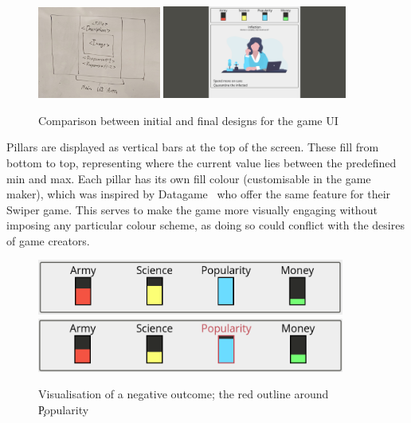 \begin{figure}[!h]
	\centering
	\includegraphics[width=0.36\textwidth]{./images/design/game_drawing.jpg}
	\includegraphics[width=0.54\textwidth]{./images/design/game.png}
	\caption{Comparison between initial and final designs for the game UI}
	\label{fig:game_comp}
\end{figure}

Pillars are displayed as vertical bars at the top of the screen. 
These fill from bottom to top, representing where the current value lies between the predefined min and max.
Each pillar has its own fill colour (customisable in the game maker), which was inspired by Datagame~\cite{Datagame} who offer the same feature for their Swiper game. This serves to make the game more visually engaging without imposing any particular colour scheme, as doing so could conflict with the desires of game creators.

\begin{figure}[!h]
	\centering
	\includegraphics[width=0.9\textwidth]{./images/design/pillars.png}
	\includegraphics[width=0.9\textwidth]{./images/design/hover.png}
	\caption{Visualisation of a negative outcome; the red outline around \c{Popularity} }
	\label{fig:colour_comp}
\end{figure}


